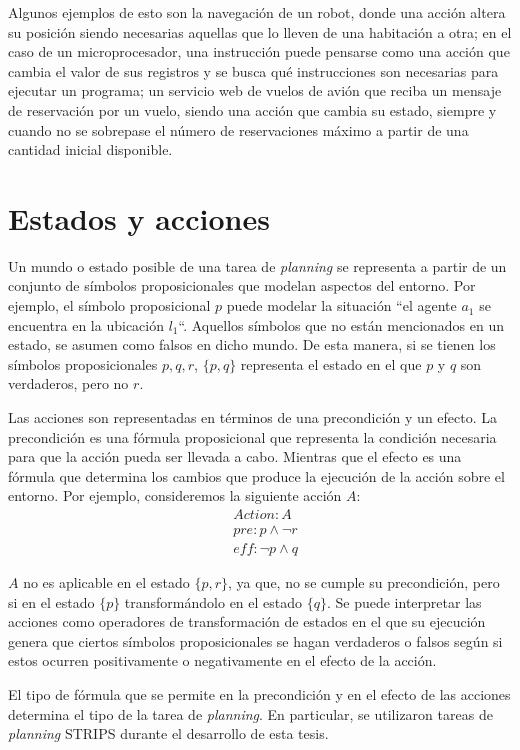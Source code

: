 Algunos ejemplos de esto son la navegación de un robot, donde una acción altera
su posición siendo necesarias aquellas que lo lleven de una habitación a otra;
en el caso de un microprocesador, una instrucción puede pensarse como una
acción que cambia el valor de sus registros y se busca qué instrucciones son
necesarias para ejecutar un programa; un servicio web de vuelos de avión que
reciba un mensaje de reservación por un vuelo, siendo una acción que cambia su
estado, siempre y cuando no se sobrepase el número de reservaciones máximo a
partir de una cantidad inicial disponible. \citep{Sandewall-2008-HandbookOK}

\section{Estados y acciones}

Un mundo o estado  posible de una tarea de \emph{planning} se representa a
partir de un conjunto de símbolos proposicionales que modelan aspectos del
entorno. Por ejemplo, el símbolo proposicional $p$ puede modelar la situación
``el agente $a_1$ se encuentra en la ubicación $l_1$``. Aquellos símbolos  que
no están mencionados en un estado, se asumen como falsos en dicho mundo. De
esta manera, si se tienen los símbolos proposicionales $p,q,r$, $\{p, q\}$
representa el estado en el que $p$ y $q$ son verdaderos, pero no $r$.

Las acciones son representadas en términos de una precondición y un efecto. La
precondición es una fórmula proposicional que representa la condición necesaria
para que la acción pueda ser llevada a cabo. Mientras que el efecto es una
fórmula que determina los cambios que produce la ejecución de la acción sobre el
entorno. Por ejemplo, consideremos la siguiente acción $A$:
\begin{align*}
    & Action : A \\
    & pre : p \land \neg r \\
    & \mathit{eff} : \neg p \land q
\end{align*}

$A$ no es aplicable en el estado $\{p, r\}$, ya que, no se cumple su
precondición, pero si en el estado $\{p\}$ transformándolo en el estado $\{q\}$.
Se puede interpretar las acciones como operadores de transformación de
estados en el que su ejecución genera que ciertos símbolos proposicionales
se hagan verdaderos o falsos según si estos ocurren positivamente o negativamente en el
efecto de la acción.

El tipo de fórmula que se permite en la precondición y en el efecto de las
acciones determina el tipo de la tarea de \emph{planning}. En particular, se
utilizaron tareas de \emph{planning} STRIPS durante el desarrollo de esta tesis.

